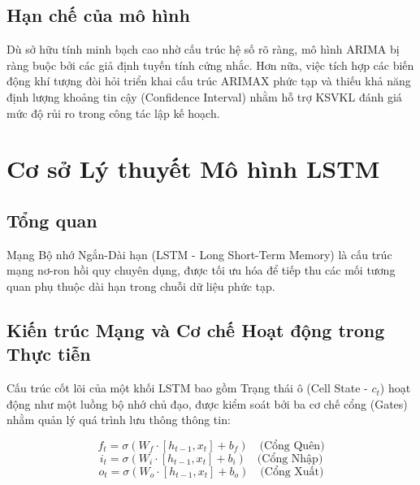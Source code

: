 \documentclass[12pt,a4paper]{article}
\begin{document}
\subsection{Hạn chế của mô hình}

Dù sở hữu tính minh bạch cao nhờ cấu trúc hệ số rõ ràng, mô hình ARIMA bị ràng buộc bởi các giả định tuyến tính cứng nhắc. Hơn nữa, việc tích hợp các biến động khí tượng đòi hỏi triển khai cấu trúc ARIMAX phức tạp và thiếu khả năng định lượng khoảng tin cậy (Confidence Interval) nhằm hỗ trợ KSVKL đánh giá mức độ rủi ro trong công tác lập kế hoạch.


\section{Cơ sở Lý thuyết Mô hình LSTM}

\subsection{Tổng quan}

Mạng Bộ nhớ Ngắn-Dài hạn (LSTM - Long Short-Term Memory) là cấu trúc mạng nơ-ron hồi quy chuyên dụng, được tối ưu hóa để tiếp thu các mối tương quan phụ thuộc dài hạn trong chuỗi dữ liệu phức tạp.

\subsection{Kiến trúc Mạng và Cơ chế Hoạt động trong Thực tiễn}

Cấu trúc cốt lõi của một khối LSTM bao gồm Trạng thái ô (Cell State - $c_t$) hoạt động như một luồng bộ nhớ chủ đạo, được kiểm soát bởi ba cơ chế cổng (Gates) nhằm quản lý quá trình lưu thông thông tin:

\begin{equation}
f_t = \sigma(W_f \cdot [h_{t-1}, x_t] + b_f) \quad \text{(Cổng Quên)}
\end{equation}
\begin{equation}
i_t = \sigma(W_i \cdot [h_{t-1}, x_t] + b_i) \quad \text{(Cổng Nhập)}
\end{equation}
\begin{equation}
o_t = \sigma(W_o \cdot [h_{t-1}, x_t] + b_o) \quad \text{(Cổng Xuất)}
\end{equation}
\end{document}

